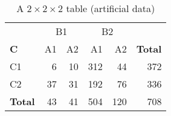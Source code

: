 \begin{table}[htb]
 \caption{A $2 \times 2 \times 2$ table (artificial data)}
 \label{tab:struc}
 \begin{center}
  \begin{tabular}{|l|rrrr|r|}
   \hline
 & \multicolumn{2}{c|}{B1} & \multicolumn{2}{c|}{B2} &  \\\cline{2-5}
{\bfseries\large C} & A1 & A2 & A1 & A2& {\bfseries\large Total} \\
   \hline
C1   &     6 &    10 &   312 &    44 &   372 \\
C2   &    37 &    31 &   192 &    76 &   336 \\
   \hline
\rule{0in}{2.5ex}{\bfseries\large Total} &   43 &    41 &   504 &   120 &   708 \\
   \hline
  \end{tabular}
 \end{center}
\end{table}

